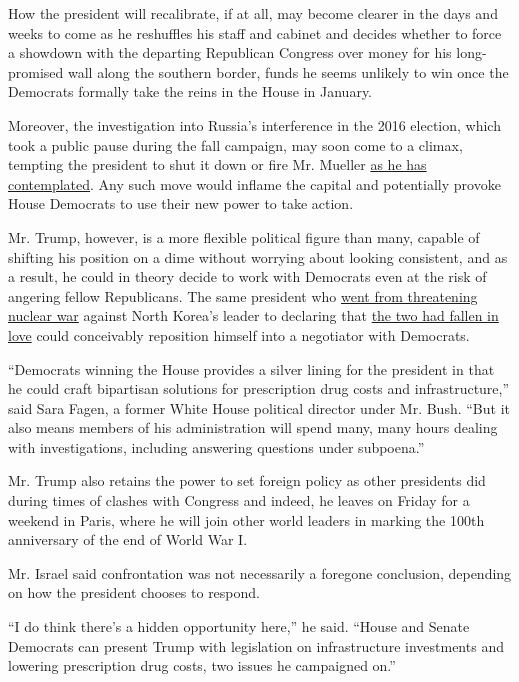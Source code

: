 How the president will recalibrate, if at all, may become clearer in the
days and weeks to come as he reshuffles his staff and cabinet and
decides whether to force a showdown with the departing Republican
Congress over money for his long-promised wall along the southern
border, funds he seems unlikely to win once the Democrats formally take
the reins in the House in January.

Moreover, the investigation into Russia's interference in the 2016
election, which took a public pause during the fall campaign, may soon
come to a climax, tempting the president to shut it down or fire Mr.
Mueller
\href{https://www.nytimes.com/2018/04/10/us/politics/trump-sought-to-fire-mueller-in-december.html}{as
he has contemplated}. Any such move would inflame the capital and
potentially provoke House Democrats to use their new power to take
action.

Mr. Trump, however, is a more flexible political figure than many,
capable of shifting his position on a dime without worrying about
looking consistent, and as a result, he could in theory decide to work
with Democrats even at the risk of angering fellow Republicans. The same
president who
\href{https://www.nytimes.com/2018/03/09/world/asia/trump-kim-jong-un.html}{went
from threatening nuclear war} against North Korea's leader to declaring
that
\href{https://www.nytimes.com/video/us/100000006136380/trump-kim-jong-un-we-fell-in-love.html}{the
two had fallen in love} could conceivably reposition himself into a
negotiator with Democrats.

``Democrats winning the House provides a silver lining for the president
in that he could craft bipartisan solutions for prescription drug costs
and infrastructure,'' said Sara Fagen, a former White House political
director under Mr. Bush. ``But it also means members of his
administration will spend many, many hours dealing with investigations,
including answering questions under subpoena.''

Mr. Trump also retains the power to set foreign policy as other
presidents did during times of clashes with Congress and indeed, he
leaves on Friday for a weekend in Paris, where he will join other world
leaders in marking the 100th anniversary of the end of World War I.

Mr. Israel said confrontation was not necessarily a foregone conclusion,
depending on how the president chooses to respond.

``I do think there's a hidden opportunity here,'' he said. ``House and
Senate Democrats can present Trump with legislation on infrastructure
investments and lowering prescription drug costs, two issues he
campaigned on.''

